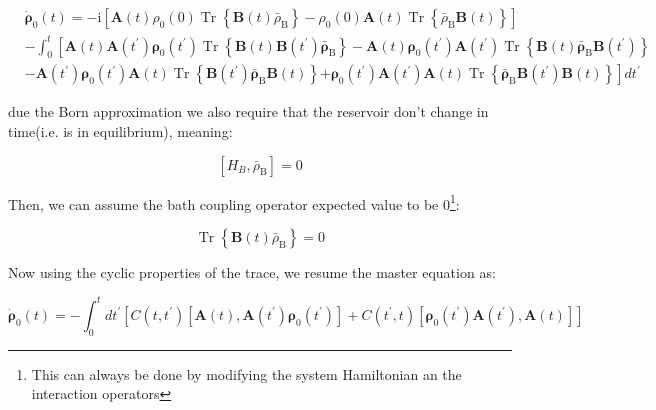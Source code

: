 \documentclass[reprint,aps,onecolumn,pra,notitlepage,nofootinbib]{revtex4-1}
\theoremstyle{definition}
\numberwithin{equation}{section}
\begin{document}
\begin{equation}\begin{aligned}
& \dot{\boldsymbol{\rho}}_0(t)=-\mathrm{i} \left[\boldsymbol{A}(t) \rho_0(0) \operatorname{Tr}\left\{ \boldsymbol{B}(t) \bar{\rho}_{\mathrm{B}}\right\}-\rho_0(0) \boldsymbol{A}(t) \operatorname{Tr}\left\{\bar{\rho}_{\mathrm{B}} \boldsymbol{B}(t)\right\}\right] \\
&- \int_{0}^{t}\left[\boldsymbol{A}(t)  \boldsymbol{A}\left(t^{\prime}\right) \boldsymbol{\rho_{\mathrm{0}}}\left(t^{\prime}\right) \operatorname{Tr}\left\{\boldsymbol{B}(t) \boldsymbol{B}\left(t^{\prime}\right) \bar{\boldsymbol{\rho}}_{\mathrm{B}}\right\}\right. -\boldsymbol{A}(t) \boldsymbol{\rho}_{\mathrm{0}}\left(t^{\prime}\right) \boldsymbol{A} \left(t^{\prime}\right) \operatorname{Tr}\left\{\boldsymbol{B}(t) \bar{\boldsymbol{\rho}}_{\mathrm{B}} \boldsymbol{B}\left(t^{\prime}\right)\right\} \\
& -\boldsymbol{A}\left(t^{\prime}\right) \boldsymbol{\rho}_{\mathrm{0}}\left(t^{\prime}\right) \boldsymbol{A}(t) \operatorname{Tr}\left\{\boldsymbol{B}\left(t^{\prime}\right) \bar{\boldsymbol{\rho}}_{\mathrm{B}} \boldsymbol{B}(t)\right\} 
\left.+\boldsymbol{\rho}_{\mathrm{0}}\left(t^{\prime}\right) \boldsymbol{A}\left(t^{\prime}\right) \boldsymbol{A}(t) \operatorname{Tr}\left\{\bar{\boldsymbol{\rho}}_{\mathrm{B}} \boldsymbol{B}\left(t^{\prime}\right) \boldsymbol{B}(t)\right\}\right] d t^{\prime}
\end{aligned}\end{equation}

due the Born approximation we also require that the reservoir don't change in time(i.e. is in equilibrium), meaning: 

\begin{equation}\left[H_{B}, \bar{\rho}_{\mathrm{B}}\right]=0\end{equation}

Then, we can assume the bath coupling operator expected value to be 0\footnote{This can always be done by modifying the system Hamiltonian an the interaction operators}:

\begin{equation}\operatorname{Tr}\left\{\boldsymbol{B}(t) \bar{\rho}_{\mathrm{B}}\right\}=0\end{equation}


Now using the cyclic properties of the trace, we resume the master equation as: 

\begin{equation}
\dot{\boldsymbol{\rho}}_0(t)=- \int_{0}^{t} d t^{\prime}\left[C\left(t, t^{\prime}\right)\left[\boldsymbol{A}(t), \boldsymbol{A}\left(t^{\prime}\right) \boldsymbol{\rho}_{\mathrm{0}}\left(t^{\prime}\right)\right]+C\left(t^{\prime}, t\right)\left[\boldsymbol{\rho}_{\mathrm{0}}\left(t^{\prime}\right) \boldsymbol{A}\left(t^{\prime}\right), \boldsymbol{A}(t)\right]\right]\end{equation}\label{Non_markovian_eq}
\end{document}
